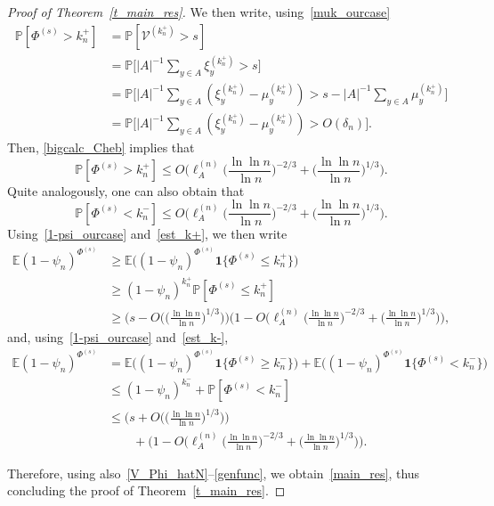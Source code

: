 \documentclass[11pt]{article}
\theoremstyle{definition}
\numberwithin{equation}{section}
\numberwithin{figure}{section}
\numberwithin{table}{section}
\newcommand{\1}[1]{{\mathbf 1}{\{#1\}}}
\newcommand{\V}{{\mathcal V}}
\newcommand{\8}{{\infty}}
\newcommand{\IP}{{\mathbb P}}
\newcommand{\IE}{{\mathbb E}}
\begin{document}
\begin{proof}[Proof of Theorem~\ref{t_main_res}]
We then write, using~\eqref{muk_ourcase}
\begin{align}
\IP[\Phi^{(s)} > k_n^{+}] &= \IP[\V^{(k_n^{+})}>s]\nonumber\\
&= \IP\Big[|A|^{-1}\sum_{y\in A}\xi_y^{(k_n^{+})}> s\Big]\nonumber\\
&= \IP\Big[|A|^{-1}\sum_{y\in A}(\xi_y^{(k_n^{+})} -\mu_y^{(k_n^{+})})> s - |A|^{-1}\sum_{y\in A}\mu_y^{(k_n^{+})}\Big]\nonumber\\
&= \IP\Big[|A|^{-1}\sum_{y\in A}(\xi_y^{(k_n^{+})} -\mu_y^{(k_n^{+})})> O(\delta_n)
\Big].\label{Cheb+}
\end{align}
Then, \eqref{bigcalc_Cheb} implies that
\begin{equation}\label{est_k+}
\IP[\Phi^{(s)} > k_n^{+}]
\leq O\Big(\ell^{(n)}_A\Big(\frac{\ln\ln n}{\ln n}\Big)^{-2/3} + \Big(\frac{\ln\ln n}{\ln n}\Big)^{1/3} \Big).
\end{equation}
Quite analogously, one can also obtain that
\begin{equation}\label{est_k-}
\IP[\Phi^{(s)} < k_n^{-}]
\leq O\Big(\ell^{(n)}_A\Big(\frac{\ln\ln n}{\ln n}\Big)^{-2/3} + \Big(\frac{\ln\ln n}{\ln n}\Big)^{1/3} \Big).
\end{equation}
Using~\eqref{1-psi_ourcase} and~\eqref{est_k+}, we then write
\begin{align}
\IE (1-\psi_n)^{\Phi^{(s)}} &\geq
\IE \big((1-\psi_n)^{\Phi^{(s)}}\1{\Phi^{(s)} \leq k_n^{+}}\big)
\nonumber\\
&\geq (1-\psi_n)^{k_n^{+}}
\IP[\Phi^{(s)} \leq k_n^{+}]\nonumber\\
&\geq \Big(s-O\Big(\Big(\frac{\ln\ln n}{\ln n}\Big)^{1/3}\Big)\Big)
\Big(1-O\Big(\ell^{(n)}_A\Big(\frac{\ln\ln n}{\ln n}\Big)^{-2/3} + \Big(\frac{\ln\ln n}{\ln n}\Big)^{1/3} \Big)\Big),\label{bigest>}
\end{align}
and, using~\eqref{1-psi_ourcase} and~\eqref{est_k-},
\begin{align}
\IE (1-\psi_n)^{\Phi^{(s)}} &=
\IE \big((1-\psi_n)^{\Phi^{(s)}}\1{\Phi^{(s)} \geq k_n^{-}}\big) + \IE \big((1-\psi_n)^{\Phi^{(s)}}\1{\Phi^{(s)} < k_n^{-}}\big)
\nonumber\\
&\leq (1-\psi_n)^{k_n^{-}} + \IP[\Phi^{(s)} < k_n^{-}]
\nonumber\\
&\leq \Big(s+O\Big(\Big(\frac{\ln\ln n}{\ln n}\Big)^{1/3}\Big)\Big)
\nonumber\\
& \qquad +
\Big(1-O\Big(\ell^{(n)}_A\Big(\frac{\ln\ln n}{\ln n}\Big)^{-2/3} + \Big(\frac{\ln\ln n}{\ln n}\Big)^{1/3} \Big)\Big).\label{bigest<}
\end{align}


Therefore, using also~\eqref{V_Phi_hatN}--\eqref{genfunc}, we obtain~\eqref{main_res}, thus concluding the proof of Theorem~\ref{t_main_res}.
\end{proof}
\end{document}
